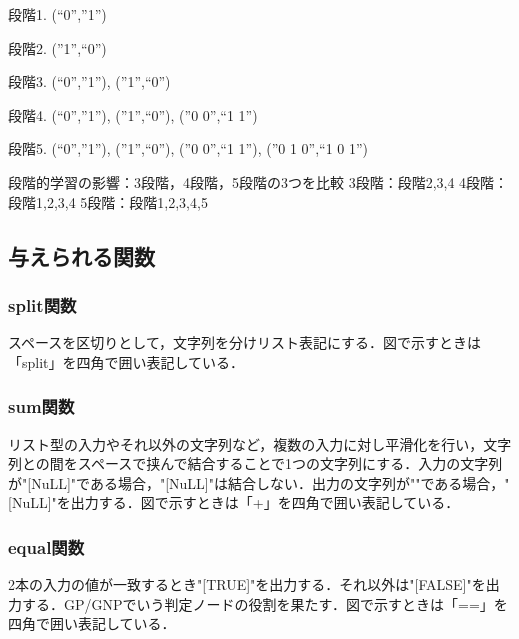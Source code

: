 \documentclass[exploratorypaper]{jsaiart} %
\begin{document}


段階1. (“0”,”1”)

段階2. (”1”,“0”)

段階3. (“0”,”1”), (”1”,“0”)

段階4. (“0”,”1”), (”1”,“0”), (”0 0”,“1 1”)

段階5. (“0”,”1”), (”1”,“0”), (”0 0”,“1 1”), (”0 1 0”,“1 0 1”)


段階的学習の影響：3段階，4段階，5段階の3つを比較
3段階：段階2,3,4
4段階：段階1,2,3,4
5段階：段階1,2,3,4,5

\subsection{与えられる関数}
\subsubsection{split関数}
スペースを区切りとして，文字列を分けリスト表記にする．図で示すときは「split」を四角で囲い表記している．


\subsubsection{sum関数}
リスト型の入力やそれ以外の文字列など，複数の入力に対し平滑化を行い，文字列との間をスペースで挟んで結合することで1つの文字列にする．入力の文字列が"[NuLL]"である場合，"[NuLL]"は結合しない．出力の文字列が""である場合，"[NuLL]"を出力する．図で示すときは「+」を四角で囲い表記している．

\subsubsection{equal関数}
2本の入力の値が一致するとき"[TRUE]"を出力する．それ以外は"[FALSE]"を出力する．GP/GNPでいう判定ノードの役割を果たす．図で示すときは「==」を四角で囲い表記している．
\end{document}
